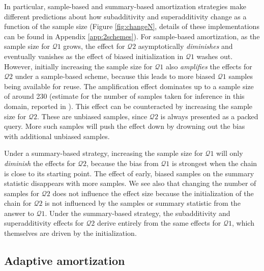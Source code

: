 In particular, sample-based and summary-based amortization strategies make different predictions about how subadditivity and superadditivity change as a function of the sample size (Figure \ref{fig:changeN}, details of these implementations can be found in Appendix \ref{app:2schemes}).
For sample-based amortization, as the sample size for $\mathcal{Q}1$ grows, the effect for $\mathcal{Q}2$ asymptotically \emph{diminishes} and eventually vanishes as the effect of biased initialization in $\mathcal{Q}1$ washes out. However, initially increasing the sample size for $\mathcal{Q}1$ also \emph{amplifies} the effects for $\mathcal{Q}2$ under a sample-based scheme, because this leads to more biased $\mathcal{Q}1$ samples being available for reuse. The amplification effect dominates up to a sample size of around 230 (estimate for the number of samples taken for inference in this domain, reported in \citet{dasgupta17}). This effect can be counteracted by increasing the sample size for $\mathcal{Q}2$. These are unbiased samples, since $\mathcal{Q}2$ is always presented as a packed query. More such samples will push the effect down by drowning out the bias with additional unbiased samples. 

Under a summary-based strategy, increasing the sample size for $\mathcal{Q}1$ will only \emph{diminish} the effects for $\mathcal{Q}2$, because the bias from $\mathcal{Q}1$ is strongest when the chain is close to its starting point. The effect of early, biased samples on the summary statistic disappears with more samples. We see also that changing the number of samples for $\mathcal{Q}2$ does not influence the effect size because the initialization of the chain for $\mathcal{Q}2$ is not influenced by the samples or summary statistic from the answer to $\mathcal{Q}1$. Under the summary-based strategy, the subadditivity and superadditivity effects for $\mathcal{Q}2$ derive entirely from the same effects for $\mathcal{Q}1$, which themselves are driven by the initialization\citet{dasgupta17}.


\subsection{Adaptive amortization}

